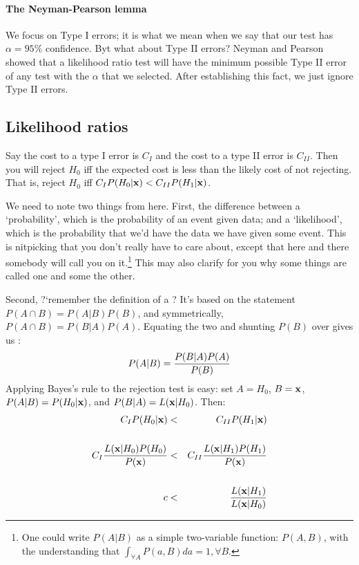 \paragraph{The Neyman-Pearson lemma} 
We focus on Type I errors; it is what we mean when we say that our
test has $\alpha=95\%$ confidence. Byt what about Type II errors? 
Neyman and Pearson showed that a likelihood ratio test will have the
minimum possible Type II error of any test with the $\alpha$ that we
selected. After establishing this fact, we just ignore Type II errors.

\subsection{Likelihood ratios} 

Say the cost to a type I error is $C_I$ and the cost to a type II error
is $C_{II}$.  Then you will reject $H_0$ iff the expected cost is less
than the likely cost of not rejecting. That is, reject $H_0$ iff $C_I
P(H_0|{\bf x})<C_{II} P(H_1|{\bf x})$.

We need to note two things from here. First, the difference between a
`probability', which is the probability of an event given data; and a
`likelihood', which is the probability that we'd have the data we have
given some event. This is nitpicking that you don't really have to care
about, except that here and there somebody will call you on
it.\footnote{One could write $P(A|B)$ as a simple two-variable function:
$P(A,B)$, with the understanding that $\int_{\forall A} P(a,B)da = 1,
\forall B$.} This may
also clarify for you why some things are called one and some the other.

Second, ?`remember the definition of a ? It's based on the
statement $P(A\cap B)=P(A|B)P(B)$, and symmetrically, $P(A\cap B)=P(B|A)P(A)$.  Equating
the two and shunting $P(B)$ over gives us : $$P(A|B)={P(B|A) P(A)\over P(B)}$$
Applying Bayes's rule to the rejection test is easy: set $A=H_0$, $B={\bf x}$,
$P(A|B)=P(H_0|{\bf x})$, and $P(B|A)=L({\bf x}|H_0)$. Then:
\begin{eqnarray}
C_I P(H_0|{\bf x})&<&C_{II} P(H_1|{\bf x})\label{firstnp}\\
\nonumber\\
C_I {L({\bf x}|H_0)P(H_0)\over P({\bf x})}&<& C_{II} {L({\bf x}|H_1)P(H_1)\over P({\bf x})}\label{secondnp}\\
\nonumber\\
c&<& {L({\bf x}|H_1)\over L({\bf x}|H_0)}\label{thirdnp}
\end{eqnarray}

